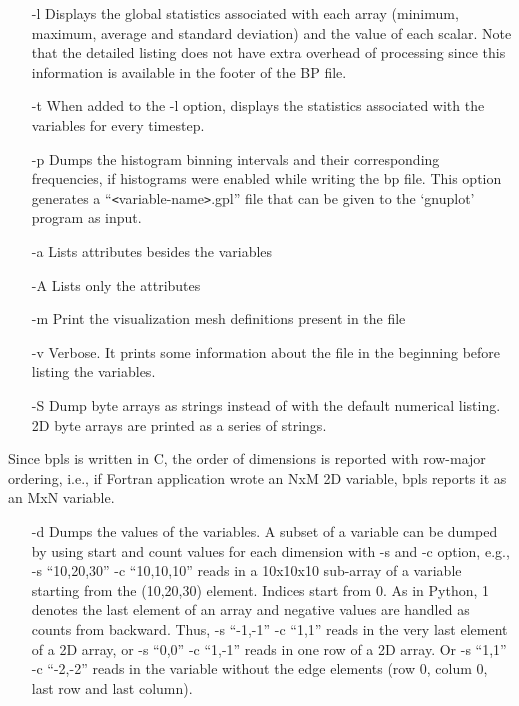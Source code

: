 \begin{itemize}
\item[-l]  Displays the global statistics associated with each array (minimum, maximum, 
average and standard deviation) and the value of each scalar. Note that the detailed 
listing does not have extra overhead of processing since this information is available 
in the footer of the BP file. 

\item[-t]  When added to the -l option, displays the statistics associated with the variables 
for every timestep. 

\item[-p] Dumps the histogram binning intervals and their corresponding frequencies, if 
histograms were enabled while writing the bp file. This option generates a ``\texttt{<}variable-name\texttt{>}.gpl'' 
file that can be given to the `gnuplot' program as input. 

\item[-a] Lists attributes besides the variables

\item[-A] Lists only the attributes

\item[-m] Print the visualization mesh definitions present in the file

%
%

\item[-v] Verbose. It prints some information about the file in the beginning before listing 
the variables. 

\item[-S] Dump byte arrays as strings instead of with the default numerical listing. 2D 
byte arrays are printed as a series of strings. 
\end{itemize}

Since bpls is written in C, the order of dimensions is reported with row-major 
ordering, i.e., if Fortran application wrote an NxM 2D variable, bpls reports it 
as an MxN variable. 

\begin{itemize}
\item[-d] Dumps the values of the variables. A subset of a variable can be dumped by using 
start and count values for each dimension with -s and -c option, e.g., -s ``10,20,30'' 
-c ``10,10,10'' reads in a 10x10x10 sub-array of a variable starting from the (10,20,30) 
element. Indices start from 0. As in Python, \-{}1 denotes the last element of 
an array and negative values are handled as counts from backward. Thus, -s ``-1,-1'' 
-c ``1,1'' reads in the very last element of a 2D array, or -s ``0,0'' -c ``1,-1'' 
reads in one row of a 2D array. Or -s ``1,1'' -c ``-2,-2'' reads in the variable 
without the edge elements (row 0, colum 0, last row and last column).
\end{itemize}

